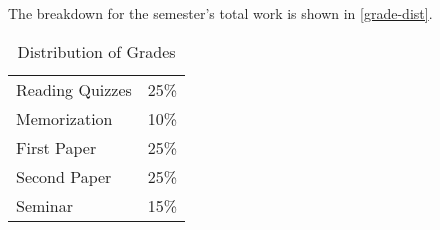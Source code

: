 \documentclass[titlepage]{article}
\newcommand\policy{../policy}
\begin{document}
The breakdown for the semester's total work is shown in
\autoref{grade-dist}.

\begin{table}[htbp]
  \centering
  {\lining
  \begin{tabular}{lr}
    \toprule
    Reading Quizzes & 25\% \\
    Memorization    & 10\% \\
    First Paper     & 25\% \\
    Second Paper    & 25\% \\
    Seminar         & 15\% \\
    \bottomrule
  \end{tabular}}
  \caption{Distribution of Grades}
  \label{grade-dist}
\end{table}



\end{document}

